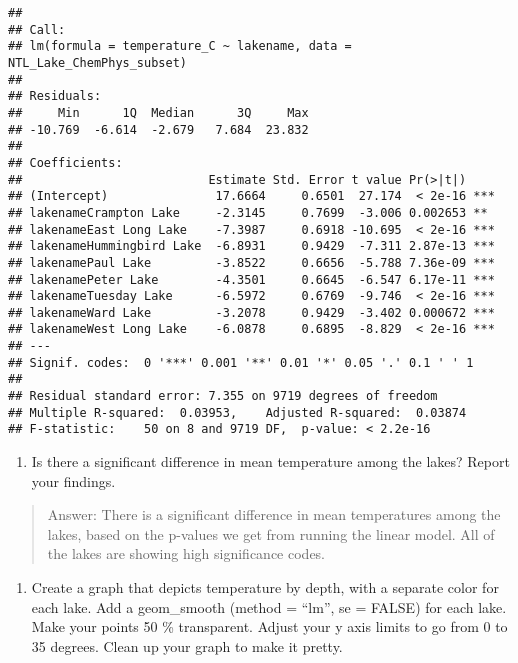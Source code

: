 \documentclass[
]{article}
\providecommand{\tightlist}{%
  \setlength{\itemsep}{0pt}\setlength{\parskip}{0pt}}
\begin{document}
\begin{verbatim}
## 
## Call:
## lm(formula = temperature_C ~ lakename, data = NTL_Lake_ChemPhys_subset)
## 
## Residuals:
##     Min      1Q  Median      3Q     Max 
## -10.769  -6.614  -2.679   7.684  23.832 
## 
## Coefficients:
##                          Estimate Std. Error t value Pr(>|t|)    
## (Intercept)               17.6664     0.6501  27.174  < 2e-16 ***
## lakenameCrampton Lake     -2.3145     0.7699  -3.006 0.002653 ** 
## lakenameEast Long Lake    -7.3987     0.6918 -10.695  < 2e-16 ***
## lakenameHummingbird Lake  -6.8931     0.9429  -7.311 2.87e-13 ***
## lakenamePaul Lake         -3.8522     0.6656  -5.788 7.36e-09 ***
## lakenamePeter Lake        -4.3501     0.6645  -6.547 6.17e-11 ***
## lakenameTuesday Lake      -6.5972     0.6769  -9.746  < 2e-16 ***
## lakenameWard Lake         -3.2078     0.9429  -3.402 0.000672 ***
## lakenameWest Long Lake    -6.0878     0.6895  -8.829  < 2e-16 ***
## ---
## Signif. codes:  0 '***' 0.001 '**' 0.01 '*' 0.05 '.' 0.1 ' ' 1
## 
## Residual standard error: 7.355 on 9719 degrees of freedom
## Multiple R-squared:  0.03953,    Adjusted R-squared:  0.03874 
## F-statistic:    50 on 8 and 9719 DF,  p-value: < 2.2e-16
\end{verbatim}

\begin{enumerate}
\def\labelenumi{\arabic{enumi}.}
\setcounter{enumi}{12}
\tightlist
\item
  Is there a significant difference in mean temperature among the lakes?
  Report your findings.
\end{enumerate}

\begin{quote}
Answer: There is a significant difference in mean temperatures among the
lakes, based on the p-values we get from running the linear model. All
of the lakes are showing high significance codes.
\end{quote}

\begin{enumerate}
\def\labelenumi{\arabic{enumi}.}
\setcounter{enumi}{13}
\tightlist
\item
  Create a graph that depicts temperature by depth, with a separate
  color for each lake. Add a geom\_smooth (method = ``lm'', se = FALSE)
  for each lake. Make your points 50 \% transparent. Adjust your y axis
  limits to go from 0 to 35 degrees. Clean up your graph to make it
  pretty.
\end{enumerate}
\end{document}
